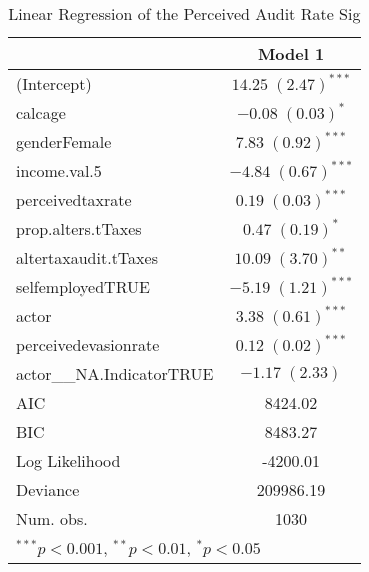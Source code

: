 
\begin{table}
\begin{tabular}{l c }
\hline
 & Model 1 \\
\hline
(Intercept)               & $14.25 \; (2.47)^{***}$ \\
calcage                   & $-0.08 \; (0.03)^{*}$   \\
genderFemale              & $7.83 \; (0.92)^{***}$  \\
income.val.5              & $-4.84 \; (0.67)^{***}$ \\
perceivedtaxrate          & $0.19 \; (0.03)^{***}$  \\
prop.alters.tTaxes        & $0.47 \; (0.19)^{*}$    \\
altertaxaudit.tTaxes      & $10.09 \; (3.70)^{**}$  \\
selfemployedTRUE          & $-5.19 \; (1.21)^{***}$ \\
actor                     & $3.38 \; (0.61)^{***}$  \\
perceivedevasionrate      & $0.12 \; (0.02)^{***}$  \\
actor\_\_NA.IndicatorTRUE & $-1.17 \; (2.33)$       \\
\hline
AIC                       & 8424.02                 \\
BIC                       & 8483.27                 \\
Log Likelihood            & -4200.01                \\
Deviance                  & 209986.19               \\
Num. obs.                 & 1030                    \\
\hline
\multicolumn{2}{l}{\scriptsize{$^{***}p<0.001$, $^{**}p<0.01$, $^*p<0.05$}}
\end{tabular}
\caption{Linear Regression of the Perceived Audit Rate Sig}
\label{table:coefficients}
\end{table}
